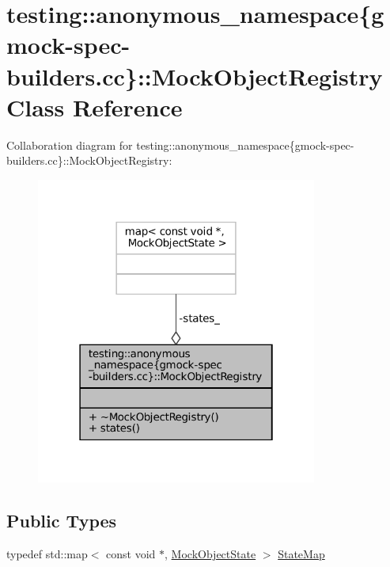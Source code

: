 \hypertarget{classtesting_1_1anonymous__namespace_02gmock-spec-builders_8cc_03_1_1MockObjectRegistry}{}\section{testing\+:\+:anonymous\+\_\+namespace\{gmock-\/spec-\/builders.cc\}\+:\+:Mock\+Object\+Registry Class Reference}
\label{classtesting_1_1anonymous__namespace_02gmock-spec-builders_8cc_03_1_1MockObjectRegistry}


Collaboration diagram for testing\+:\+:anonymous\+\_\+namespace\{gmock-\/spec-\/builders.cc\}\+:\+:Mock\+Object\+Registry\+:
\nopagebreak
\begin{figure}[H]
\begin{center}
\leavevmode
\includegraphics[width=262pt]{classtesting_1_1anonymous__namespace_02gmock-spec-builders_8cc_03_1_1MockObjectRegistry__coll__graph}
\end{center}
\end{figure}
\subsection*{Public Types}
\begin{DoxyCompactItemize}
\item 
typedef std\+::map$<$ const void $\ast$, \hyperlink{structtesting_1_1anonymous__namespace_02gmock-spec-builders_8cc_03_1_1MockObjectState}{Mock\+Object\+State} $>$ \hyperlink{classtesting_1_1anonymous__namespace_02gmock-spec-builders_8cc_03_1_1MockObjectRegistry_aaa830ac72cc6bc5007f65f7257d97765}{State\+Map}
\end{DoxyCompactItemize}
